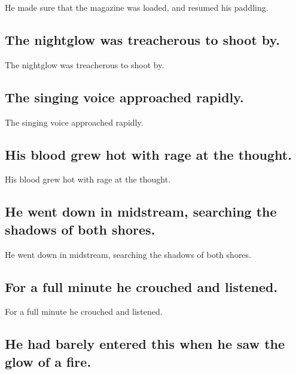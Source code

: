 \documentclass[]{article}
\begin{document}
He made sure that the magazine was loaded, and resumed his paddling.

\hypertarget{the-nightglow-was-treacherous-to-shoot-by.}{%
\subsection{The nightglow was treacherous to shoot
by.}\label{the-nightglow-was-treacherous-to-shoot-by.}}

The nightglow was treacherous to shoot by.

\hypertarget{the-singing-voice-approached-rapidly.}{%
\subsection{The singing voice approached
rapidly.}\label{the-singing-voice-approached-rapidly.}}

The singing voice approached rapidly.

\hypertarget{his-blood-grew-hot-with-rage-at-the-thought.}{%
\subsection{His blood grew hot with rage at the
thought.}\label{his-blood-grew-hot-with-rage-at-the-thought.}}

His blood grew hot with rage at the thought.

\hypertarget{he-went-down-in-midstream-searching-the-shadows-of-both-shores.}{%
\subsection{He went down in midstream, searching the shadows of both
shores.}\label{he-went-down-in-midstream-searching-the-shadows-of-both-shores.}}

He went down in midstream, searching the shadows of both shores.

\hypertarget{for-a-full-minute-he-crouched-and-listened.}{%
\subsection{For a full minute he crouched and
listened.}\label{for-a-full-minute-he-crouched-and-listened.}}

For a full minute he crouched and listened.

\hypertarget{he-had-barely-entered-this-when-he-saw-the-glow-of-a-fire.}{%
\subsection{He had barely entered this when he saw the glow of a
fire.}\label{he-had-barely-entered-this-when-he-saw-the-glow-of-a-fire.}}
\end{document}
